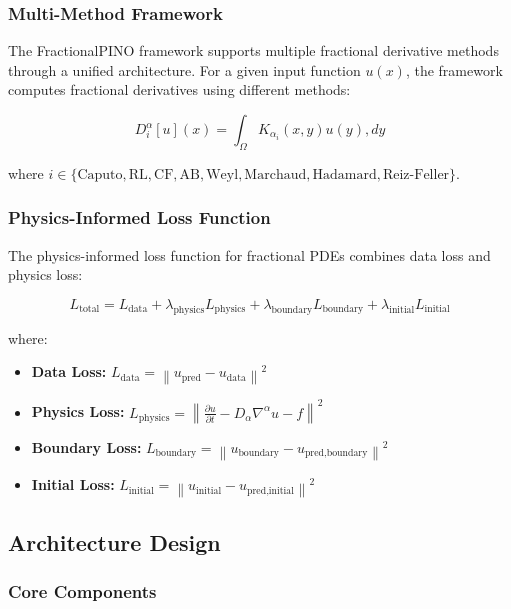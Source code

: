 \documentclass[12pt,a4paper]{article}
\newcommand{\norm}[1]{\left\|#1\right\|}
\theoremstyle{definition}
\begin{document}
\subsubsection{Multi-Method Framework}

The FractionalPINO framework supports multiple fractional derivative methods through a unified architecture. For a given input function $u(x)$, the framework computes fractional derivatives using different methods:

$$D^\alpha_i[u](x) = \int_\Omega K_{\alpha_i}(x,y)u(y), dy$$

where $i \in \{\text{Caputo}, \text{RL}, \text{CF}, \text{AB}, \text{Weyl}, \text{Marchaud}, \text{Hadamard}, \text{Reiz-Feller}\}$.

\subsubsection{Physics-Informed Loss Function}

The physics-informed loss function for fractional PDEs combines data loss and physics loss:

$$L_{\text{total}} = L_{\text{data}} + \lambda_{\text{physics}} L_{\text{physics}} + \lambda_{\text{boundary}} L_{\text{boundary}} + \lambda_{\text{initial}} L_{\text{initial}}$$

where:

\begin{itemize}
    \item \textbf{Data Loss:} $L_{\text{data}} = \norm{u_{\text{pred}} - u_{\text{data}}}^2$
    \item \textbf{Physics Loss:} $L_{\text{physics}} = \norm{\frac{\partial u}{\partial t} - D_\alpha \nabla^\alpha u - f}^2$
    \item \textbf{Boundary Loss:} $L_{\text{boundary}} = \norm{u_{\text{boundary}} - u_{\text{pred,boundary}}}^2$
    \item \textbf{Initial Loss:} $L_{\text{initial}} = \norm{u_{\text{initial}} - u_{\text{pred,initial}}}^2$
\end{itemize}

\subsection{Architecture Design}

\subsubsection{Core Components}
\end{document}
